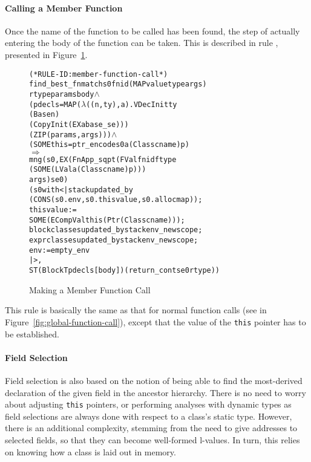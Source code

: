 \documentclass[11pt]{article}
\begin{document}
\paragraph{Calling a Member Function}
Once the name of the function to be called has been found, the step of
actually entering the body of the function can be taken.  This is
described in rule , presented in
Figure~\ref{fig:member-function-call}.
\begin{figure}[htbp]
\begin{center}
\begin{minipage}{\textwidth}
%
\begin{alltt}
(* RULE-ID: member-function-call *)
     find_best_fnmatch s0 fnid (MAP valuetype args)
                       rtype params body \(\land\)
     (pdecls = MAP (\(\lambda\)((n,ty),a). VDecInit ty
                                     (Base n)
                                     (CopyInit (EX a base_se)))
                   (ZIP (params, args))) \(\land\)
     (SOME this = ptr_encode s0 a (Class cname) p)
   \(\Rightarrow\)
     mng (s0, EX (FnApp_sqpt (FVal fnid ftype
                                   (SOME (LVal a (Class cname) p)))
                             args) se0)
         (s0 with <| stack updated_by
                       (CONS (s0.env, s0.thisvalue, s0.allocmap));
                     thisvalue :=
                       SOME (ECompVal this (Ptr (Class cname)));
                     blockclasses updated_by stackenv_newscope ;
                     exprclasses updated_by stackenv_newscope ;
                     env := empty_env
                  |>,
          ST (Block T pdecls [body]) (return_cont se0 rtype))
\end{alltt}
\end{minipage}
\end{center}
\caption{Making a Member Function Call}
\label{fig:member-function-call}
\end{figure}
This rule is basically the same as that for normal function calls (see
 in
Figure~\ref{fig:global-function-call}), except that the value of the
\texttt{this} pointer has to be established.

\paragraph{Field Selection}
Field selection is also based on the notion of being able to find the
most-derived declaration of the given field in the ancestor hierarchy.
There is no need to worry about adjusting \texttt{this} pointers, or
performing analyses with dynamic types as field selections are always
done with respect to a class's static type.  However, there is an
additional complexity, stemming from the need to give addresses to
selected fields, so that they can become well-formed l-values.  In
turn, this relies on knowing how a class is laid out in memory.
\end{document}

